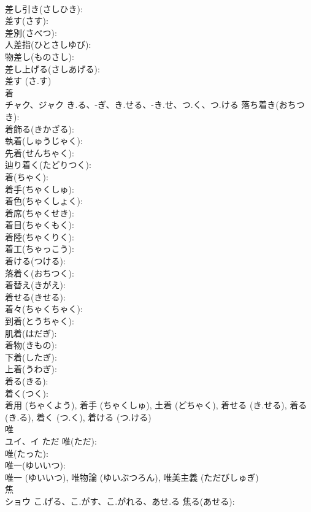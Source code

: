 \documentclass[8pt]{extreport}
\begin{document}
\begin{CJK}{UTF8}{min}
\\	差し引き(さしひき): 
\\	差す(さす): 
\\	差別(さべつ): 
\\	人差指(ひとさしゆび): 
\\	物差し(ものさし): 
\\	差し上げる(さしあげる): 
\\	差す (さ.す)
\\	着			
\\	チャク、ジャク	き.る、-ぎ、き.せる、-き.せ、つ.く、つ.ける	落ち着き(おちつき): 
\\	着飾る(きかざる): 
\\	執着(しゅうじゃく): 
\\	先着(せんちゃく): 
\\	辿り着く(たどりつく): 
\\	着(ちゃく): 
\\	着手(ちゃくしゅ): 
\\	着色(ちゃくしょく): 
\\	着席(ちゃくせき): 
\\	着目(ちゃくもく): 
\\	着陸(ちゃくりく): 
\\	着工(ちゃっこう): 
\\	着ける(つける): 
\\	落着く(おちつく): 
\\	着替え(きがえ): 
\\	着せる(きせる): 
\\	着々(ちゃくちゃく): 
\\	到着(とうちゃく): 
\\	肌着(はだぎ): 
\\	着物(きもの): 
\\	下着(したぎ): 
\\	上着(うわぎ): 
\\	着る(きる): 
\\	着く(つく): 
\\	着用 (ちゃくよう), 着手 (ちゃくしゅ), 土着 (どちゃく), 着せる (き.せる), 着る (き.る), 着く (つ.く), 着ける (つ.ける)
\\	唯			
\\	ユイ、イ	ただ	唯(ただ): 
\\	唯(たった): 
\\	唯一(ゆいいつ): 
\\	唯一 (ゆいいつ), 唯物論 (ゆいぶつろん), 唯美主義 (ただびしゅぎ)
\\	焦			
\\	ショウ	こ.げる、こ.がす、こ.がれる、あせ.る	焦る(あせる): 

\end{CJK}
\end{document}
